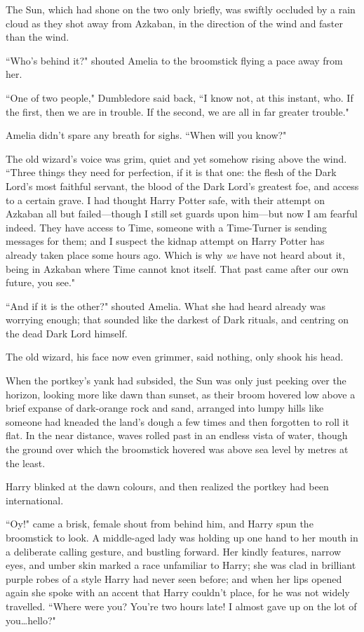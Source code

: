 \later

The Sun, which had shone on the two only briefly, was swiftly occluded by a rain cloud as they shot away from Azkaban, in the direction of the wind and faster than the wind.

``Who's behind it?" shouted Amelia to the broomstick flying a pace away from her.

``One of two people," Dumbledore said back, ``I know not, at this instant, who. If the first, then we are in trouble. If the second, we are all in far greater trouble."

Amelia didn't spare any breath for sighs. ``When will you know?"

The old wizard's voice was grim, quiet and yet somehow rising above the wind. ``Three things they need for perfection, if it is that one: the flesh of the Dark Lord's most faithful servant, the blood of the Dark Lord's greatest foe, and access to a certain grave. I had thought Harry Potter safe, with their attempt on Azkaban all but failed—though I still set guards upon him—but now I am fearful indeed. They have access to Time, someone with a Time-Turner is sending messages for them; and I suspect the kidnap attempt on Harry Potter has already taken place some hours ago. Which is why \emph{we} have not heard about it, being in Azkaban where Time cannot knot itself. That past came after our own future, you see."

``And if it is the other?" shouted Amelia. What she had heard already was worrying enough; that sounded like the darkest of Dark rituals, and centring on the dead Dark Lord himself.

The old wizard, his face now even grimmer, said nothing, only shook his head.

\later

When the portkey's yank had subsided, the Sun was only just peeking over the horizon, looking more like dawn than sunset, as their broom hovered low above a brief expanse of dark-orange rock and sand, arranged into lumpy hills like someone had kneaded the land's dough a few times and then forgotten to roll it flat. In the near distance, waves rolled past in an endless vista of water, though the ground over which the broomstick hovered was above sea level by metres at the least.

Harry blinked at the dawn colours, and then realized the portkey had been international.

``Oy!" came a brisk, female shout from behind him, and Harry spun the broomstick to look. A middle-aged lady was holding up one hand to her mouth in a deliberate calling gesture, and bustling forward. Her kindly features, narrow eyes, and umber skin marked a race unfamiliar to Harry; she was clad in brilliant purple robes of a style Harry had never seen before; and when her lips opened again she spoke with an accent that Harry couldn't place, for he was not widely travelled. ``Where were you? You're two hours late! I almost gave up on the lot of you…hello?"


